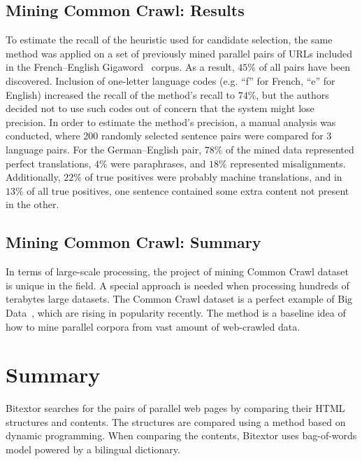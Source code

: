 \subsection{Mining Common Crawl: Results}
\label{subsection:mining_common_crawl_results}

To estimate the recall of the heuristic used for candidate selection, the same method was applied on a set of previously mined parallel pairs of URLs included in the French--English Gigaword~\cite{Burch11} corpus. As a result, $45\%$ of all pairs have been discovered. Inclusion of one-letter language codes (e.g. ``f'' for French, ``e'' for English) increased the recall of the method's recall to $74\%$, but the authors decided not to use such codes out of concern that the system might lose precision. In order to estimate the method's precision, a manual analysis was conducted, where 200 randomly selected sentence pairs were compared for 3 language pairs. For the German--English pair, $78\%$ of the mined data represented perfect translations, $4\%$ were paraphrases, and $18\%$ represented misalignments. Additionally, $22\%$ of true positives were probably machine translations, and in $13\%$ of all true positives, one sentence contained some extra content not present in the other.

\subsection{Mining Common Crawl: Summary}
\label{subsection:mining_common_crawl_summary}

In terms of large-scale processing, the project of mining Common Crawl dataset is unique in the field. A special approach is needed when processing hundreds of terabytes large datasets. The Common Crawl dataset is a perfect example of Big Data~\cite{Holubova15}, which are rising in popularity recently. The method is a baseline idea of how to mine parallel corpora from vast amount of web-crawled data.

\section{Summary}
\label{section:related_work_summary}

Bitextor searches for the pairs of parallel web pages by comparing their HTML structures and contents. The structures are compared using a method based on dynamic programming. When comparing the contents, Bitextor uses bag-of-words model powered by a bilingual dictionary. 

